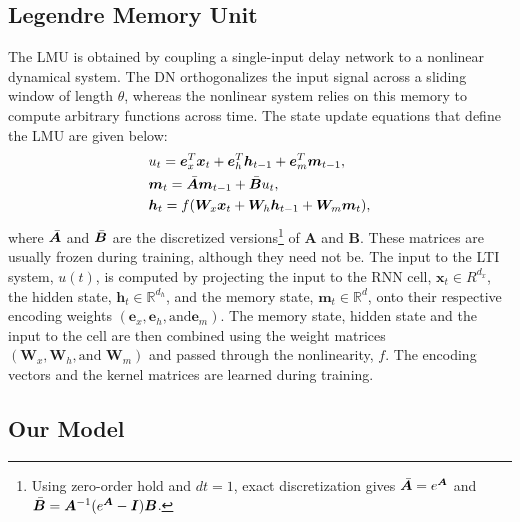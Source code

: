 \documentclass{article}
\def\ve{{\bm{e}}}
\def\vh{{\bm{h}}}
\def\vm{{\bm{m}}}
\def\vx{{\bm{x}}}
\def\mA{{\bm{A}}}
\def\mB{{\bm{B}}}
\def\mI{{\bm{I}}}
\def\mW{{\bm{W}}}
\newcommand{\R}{\mathbb{R}}
\begin{document}
\subsection{Legendre Memory Unit}\label{LMU section}
The LMU is obtained by coupling a single-input delay network to a nonlinear dynamical system. The DN orthogonalizes the input signal across a sliding window of length $\theta$, whereas the nonlinear system relies on this memory to compute arbitrary functions across time. The state update equations that define the LMU are given below: 
\begin{align}
    \displaystyle
    & u_{t} = \ve_{x}^{T} \vx_{t} + \ve_{h}^{T}\vh_{t-1} + \ve_{m}^{T}\vm_{t-1},\label{input} \\
    &\vm_{t} = \Bar{\mA} \vm_{t-1} + \Bar{\mB} u_{t},\label{DN}\\
    &\vh_{t} = f(\mW_{x} \vx_{t} + \mW_{h} \vh_{t-1} + \mW_{m} \vm_{t}), \label{nonlinear dynamical system}  
\end{align}
where $\Bar{\mA}$ and $\Bar{\mB}$ are the discretized versions\footnote{Using zero-order hold and $dt=1$, exact discretization gives $\Bar{\mA} = e^{\mA}$ and  $\Bar{\mB} = \mA^{-1}(e^{\mA} - \mI)\mB$.} of $\mA$ and $\mB$. These matrices are usually frozen during training, although they need not be. The input to the LTI system, $u(t)$, is computed by projecting the input to the RNN cell, $\vx_{t} \in R^{d_x}$, the hidden state, $\vh_{t} \in \R^{d_h}$, and the memory state, $\vm_{t} \in \R^{d}$, onto their respective encoding weights $(\ve_{x}, \ve_{h}, \text{and
}\ve_{m})$. The memory state, hidden state and the input to the cell are then combined using the weight matrices $(\mW_{x},\mW_{h}, \text{and } \mW_{m})$ and passed through the nonlinearity, $f$. The encoding vectors and the kernel matrices are learned during training. 

\subsection{Our Model}\label{section_ff_LMU}
\end{document}
